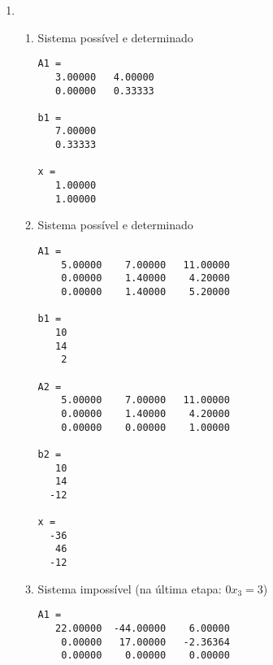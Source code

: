 \documentclass[a4paper]{article}
\begin{document}
\begin{enumerate}
\item %
  \begin{enumerate}
  \item Sistema possível e determinado
    \begin{verbatim}
A1 =
   3.00000   4.00000
   0.00000   0.33333

b1 =
   7.00000
   0.33333

x =
   1.00000
   1.00000
\end{verbatim}
    
  \item Sistema possível e determinado
\begin{verbatim}
A1 =
    5.00000    7.00000   11.00000
    0.00000    1.40000    4.20000
    0.00000    1.40000    5.20000

b1 =
   10
   14
    2

A2 =
    5.00000    7.00000   11.00000
    0.00000    1.40000    4.20000
    0.00000    0.00000    1.00000

b2 =
   10
   14
  -12

x =
  -36
   46
  -12
\end{verbatim}

  \item Sistema impossível (na última etapa: $0x_3 = 3$)
\begin{verbatim}
A1 =
   22.00000  -44.00000    6.00000
    0.00000   17.00000   -2.36364
    0.00000    0.00000    0.00000


\end{verbatim}
\end{enumerate}
\end{enumerate}
\end{document}
